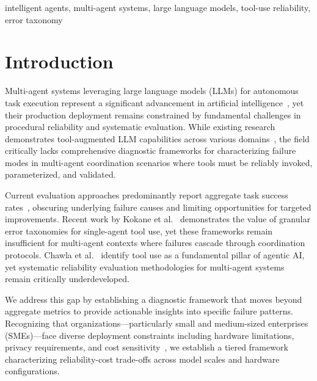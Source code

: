 \documentclass[conference]{IEEEtran}
\begin{document}
\begin{IEEEkeywords}
intelligent agents, multi-agent systems, large language models, tool-use reliability, error taxonomy
\end{IEEEkeywords}

\section{Introduction}
\label{sec:Introduction}

Multi-agent systems leveraging large language models (LLMs) for autonomous task execution represent a significant advancement in artificial intelligence~\cite{acharya2025agentic,hong2024metagpt}, yet their production deployment remains constrained by fundamental challenges in procedural reliability and systematic evaluation. While existing research demonstrates tool-augmented LLM capabilities across various domains~\cite{schick2023toolformer,shen2023hugginggpt,qin2023toolllm}, the field critically lacks comprehensive diagnostic frameworks for characterizing failure modes in multi-agent coordination scenarios where tools must be reliably invoked, parameterized, and validated.

Current evaluation approaches predominantly report aggregate task success rates~\cite{hendrycks2021measuring,zheng2024judging}, obscuring underlying failure causes and limiting opportunities for targeted improvements. Recent work by Kokane et al.~\cite{kokane2024spectool} demonstrates the value of granular error taxonomies for single-agent tool use, yet these frameworks remain insufficient for multi-agent contexts where failures cascade through coordination protocols. Chawla et al.~\cite{chawla2024agentic} identify tool use as a fundamental pillar of agentic AI, yet systematic reliability evaluation methodologies for multi-agent systems remain critically underdeveloped.

We address this gap by establishing a diagnostic framework that moves beyond aggregate metrics to provide actionable insights into specific failure patterns. Recognizing that organizations—particularly small and medium-sized enterprises (SMEs)—face diverse deployment constraints including hardware limitations, privacy requirements, and cost sensitivity~\cite{huang2025llms}, we establish a tiered framework characterizing reliability-cost trade-offs across model scales and hardware configurations. %
\end{document}

